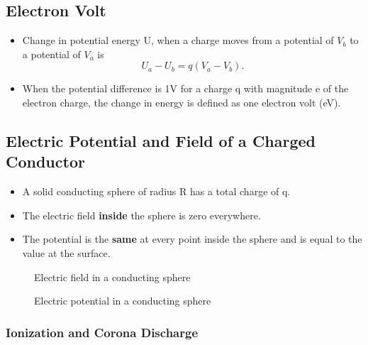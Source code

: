 \subsection{Electron Volt}%
\label{sub:electron_volt}

\begin{itemize}
	\item Change in potential energy U, when a charge moves from a potential of $V_{b}$ to a
		potential of $V_{a}$ is \[U_{a} - U_{b} = q(V_{a} - V_{b}).\]
		\item When the potential difference is 1V for a charge q with magnitude e of the electron
			charge, the change in energy is defined as one electron volt (eV).
\end{itemize}

\subsection{Electric Potential and Field of a Charged Conductor}%
\label{sub:electric_potential_and_field_of_a_charged_conductor}

\begin{itemize}
	\item A solid conducting sphere of radius R has a total charge of q.
	\item The electric field \textbf{inside} the sphere is zero everywhere.
		\item The potential is the \textbf{same} at every point inside the sphere
			and is equal to the value at the surface.
\end{itemize}

\begin{figure}[ht]
    \centering
    \caption{Electric field in a conducting sphere}
    \label{fig:electric-field-in-a-conducting-sphere}
\end{figure}


\begin{figure}[ht]
    \centering
    \caption{Electric potential in a conducting sphere}
    \label{fig:electric-potential-in-a-conducting-sphere}
\end{figure}


\subsubsection{Ionization and Corona Discharge}%
\label{ssub:ionization_and_corona_discharge}

